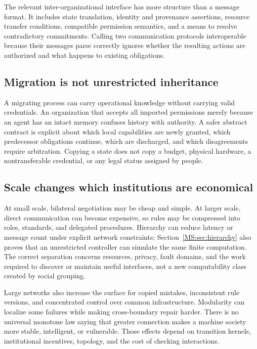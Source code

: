 The relevant inter-organizational interface has more structure than a message format. It includes state translation, identity and provenance assertions, resource transfer conditions, compatible permission semantics, and a means to resolve contradictory commitments. Calling two communication protocols interoperable because their messages parse correctly ignores whether the resulting actions are authorized and what happens to existing obligations.

\subsection{Migration is not unrestricted inheritance}

A migrating process can carry operational knowledge without carrying valid credentials. An organization that accepts all imported permissions merely because an agent has an intact memory confuses history with authority. A safer abstract contract is explicit about which local capabilities are newly granted, which predecessor obligations continue, which are discharged, and which disagreements require arbitration. Copying a state does not copy a budget, physical hardware, a nontransferable credential, or any legal status assigned by people.

\subsection{Scale changes which institutions are economical}

At small scale, bilateral negotiation may be cheap and simple. At larger scale, direct communication can become expensive, so rules may be compressed into roles, standards, and delegated procedures. Hierarchy can reduce latency or message count under explicit network constraints; Section~\ref{MS:sec:hierarchy} also proves that an unrestricted controller can simulate the same finite computation. The correct separation concerns resources, privacy, fault domains, and the work required to discover or maintain useful interfaces, not a new computability class created by social grouping.

Large networks also increase the surface for copied mistakes, inconsistent rule versions, and concentrated control over common infrastructure. Modularity can localize some failures while making cross-boundary repair harder. There is no universal monotone law saying that greater connection makes a machine society more stable, intelligent, or vulnerable. Those effects depend on transition kernels, institutional incentives, topology, and the cost of checking interactions.

